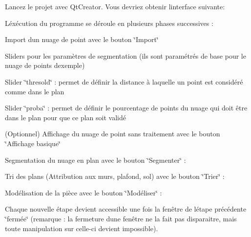 Lancez le projet avec Qt\+Creator. Vous devriez obtenir l\textquotesingle{}interface suivante\+:



L\textquotesingle{}éxécution du programme se déroule en plusieurs phases successives \+:


\begin{DoxyItemize}
\item Import d\textquotesingle{}un nuage de point avec le bouton \char`\"{}\+Import\char`\"{}
\item Sliders pour les paramètres de segmentation (ils sont paramétrés de base pour le nuage de points d\textquotesingle{}exemple)
\begin{DoxyItemize}
\item Slider \char`\"{}thresold\char`\"{} \+: permet de définir la distance à laquelle un point est considéré comme dans le plan
\item Slider \char`\"{}proba\char`\"{} \+: permet de définir le pourcentage de points du nuage qui doit être dans le plan pour que ce plan soit validé
\end{DoxyItemize}
\item (Optionnel) Affichage du nuage de point sans traitement avec le bouton \char`\"{}\+Affichage basique\char`\"{}
\item Segmentation du nuage en plan avec le bouton \char`\"{}\+Segmenter\char`\"{} \+: 
\item Tri des plans (Attribution aux murs, plafond, sol) avec le bouton \char`\"{}\+Trier\char`\"{} \+: 
\item Modélisation de la pièce avec le bouton \char`\"{}\+Modéliser\char`\"{} \+: 
\end{DoxyItemize}

Chaque nouvelle étape devient accessible une fois la fenêtre de l\textquotesingle{}étape précédente \char`\"{}fermée\char`\"{} (remarque \+: la fermeture d\textquotesingle{}une fenêtre ne la fait pas disparaitre, mais toute manipulation sur celle-\/ci devient impossible). 
